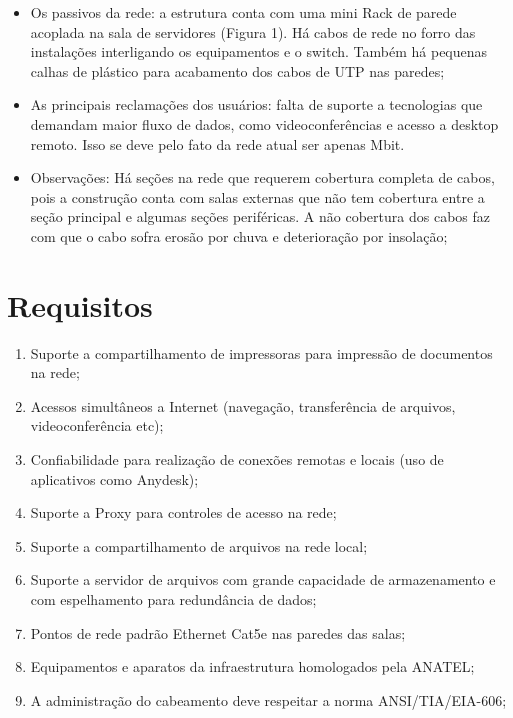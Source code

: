 \documentclass[	DIV=calc,%
							paper=a4,%
							fontsize=12pt,%
							onecolumn]{scrartcl}	 					%
\begin{document}
\begin{itemize}
	\item Os passivos da rede: a estrutura conta com uma mini Rack de parede acoplada na sala de servidores (Figura 1). Há cabos de rede no forro das instalações interligando os equipamentos e o switch. Também há pequenas calhas de plástico para acabamento dos cabos de UTP nas paredes;
	
	\item As principais reclamações dos usuários: falta de suporte a tecnologias que demandam maior fluxo de dados, como videoconferências e acesso a desktop remoto. Isso se deve pelo fato da rede atual ser apenas Mbit.
	
	\item Observações: Há seções na rede que requerem cobertura completa de cabos, pois a construção conta com salas externas que não tem cobertura entre a seção principal e algumas seções periféricas. A não cobertura dos cabos faz com que o cabo sofra erosão por chuva e deterioração por insolação;
	
\end{itemize}

\section{Requisitos}
\begin{enumerate}
	\item Suporte a compartilhamento de impressoras para impressão de documentos na rede;
	\item Acessos simultâneos a Internet (navegação, transferência de arquivos, videoconferência etc);
	\item Confiabilidade para realização de conexões remotas e locais (uso de aplicativos como Anydesk);
	\item Suporte a Proxy para controles de acesso na rede;
	\item Suporte a compartilhamento de arquivos na rede local;
	\item Suporte a servidor de arquivos com grande capacidade de armazenamento e com espelhamento para redundância de dados;
	\item Pontos de rede padrão Ethernet Cat5e nas paredes das salas; 
	\item Equipamentos e aparatos da infraestrutura homologados pela ANATEL;
	\item A administração do cabeamento deve respeitar a norma ANSI/TIA/EIA-606;
\end{enumerate}
\end{document}

